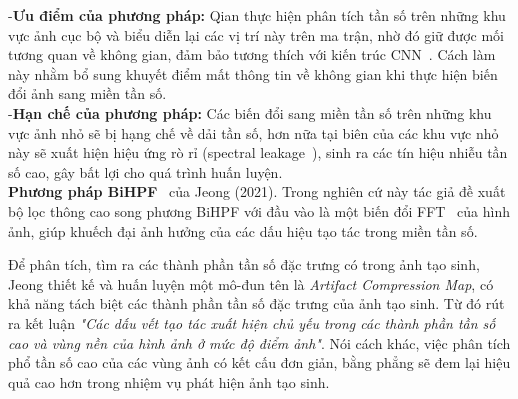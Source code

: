 %
%
-\textbf{Ưu điểm của phương pháp:}
%
Qian thực hiện phân tích tần số trên những khu vực ảnh cục bộ và biểu diễn lại các vị trí này trên ma trận, nhờ đó giữ được mối tương quan về không gian, đảm bảo tương thích với kiến trúc CNN~\cite{Krizhevsky2012ImageNetCW}. Cách làm này nhằm bổ sung khuyết điểm mất thông tin về không gian khi thực hiện biến đổi ảnh sang miền tần số.\\
%
%
-\textbf{Hạn chế của phương pháp:}
%
Các biến đổi sang miền tần số trên những khu vực ảnh nhỏ sẽ bị hạng chế về dải tần số, hơn nữa tại biên của các khu vực nhỏ này sẽ xuất hiện hiệu ứng rò rỉ (spectral leakage~\cite{ni_spectral_leakage}), sinh ra các tín hiệu nhiễu tần số cao, gây bất lợi cho quá trình huấn luyện.\\
%
%
\textbf{Phương pháp BiHPF}~\cite{Jeong2021BiHPFBH} của Jeong (2021).
%
Trong nghiên cứ này tác giả đề xuất bộ lọc thông cao song phương BiHPF với đầu vào là một biến đổi FFT~\cite{Arunachalam2013TheFF} của hình ảnh, giúp khuếch đại ảnh hưởng của các dấu hiệu tạo tác trong miền tần số.

Để phân tích, tìm ra các thành phần tần số đặc trưng có trong ảnh tạo sinh, Jeong thiết kế và huấn luyện một mô-đun tên là \textit{Artifact Compression Map}, có khả năng tách biệt các thành phần tần số đặc trưng của ảnh tạo sinh. Từ đó rút ra kết luận \textit{"Các dấu vết tạo tác xuất hiện chủ yếu trong các thành phần tần số cao và vùng nền của hình ảnh ở mức độ điểm ảnh"}. Nói cách khác, việc phân tích phổ tần số cao của các vùng ảnh có kết cấu đơn giản, bằng phẳng sẽ đem lại hiệu quả cao hơn trong nhiệm vụ phát hiện ảnh tạo sinh.

